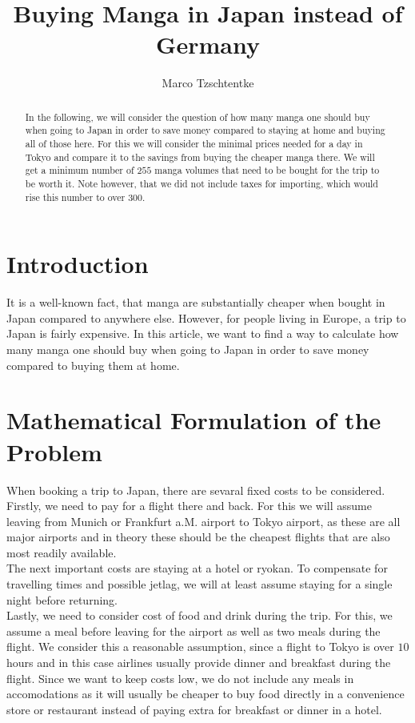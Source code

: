 \documentclass{article}
\title{Buying Manga in Japan instead of Germany}
\author{Marco Tzschtentke}
\begin{document}
\maketitle
\begin{abstract}
In the following, we will consider the question of how many manga one should buy when going to Japan in order to save money compared to staying at home and buying all of those here.
For this we will consider the minimal prices needed for a day in Tokyo and compare it to the savings from buying the cheaper manga there.
We will get a minimum number of $255$ manga volumes that need to be bought for the trip to be worth it.
Note however, that we did not include taxes for importing, which would rise this number to over $300$.
\end{abstract}
\section{Introduction}
It is a well-known fact, that manga are substantially cheaper when bought in Japan compared to anywhere else. 
However, for people living in Europe, a trip to Japan is fairly expensive.
In this article, we want to find a way to calculate how many manga one should buy when going to Japan in order to save money compared to buying them at home. 

\section{Mathematical Formulation of the Problem}
When booking a trip to Japan, there are sevaral fixed costs to be considered. 
Firstly, we need to pay for a flight there and back.
For this we will assume leaving from Munich or Frankfurt a.M. airport to Tokyo airport, as these are all major airports and in theory these should be the cheapest flights that are also most readily available. \\
The next important costs are staying at a hotel or ryokan. 
To compensate for travelling times and possible jetlag, we will at least assume staying for a single night before returning.\\
Lastly, we need to consider cost of food and drink during the trip.
For this, we assume a meal before leaving for the airport as well as two meals during the flight.
We consider this a reasonable assumption, since a flight to Tokyo is over $10$ hours and in this case airlines usually provide dinner and breakfast during the flight.
Since we want to keep costs low, we do not include any meals in accomodations as it will usually be cheaper to buy food directly in a convenience store or restaurant instead of paying extra for breakfast or dinner in a hotel.
\end{document}
